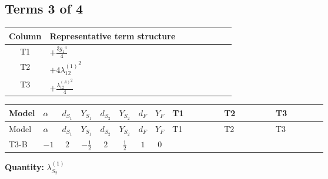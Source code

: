 \documentclass[8pt]{article}
\begin{document}
\begin{landscape}
\subsection*{Terms 3 of 4}
\begin{center}
\begin{tabular}{@{}c >{\raggedright\arraybackslash}p{0.82\linewidth}@{}}
\toprule
Column & Representative term structure \\
\midrule
T1 & \(\displaystyle +\frac{3 {g_1}^4}{4}\) \\
\midrule
T2 & \(\displaystyle +4 {\lambda_{12}^{(1)}}^2\) \\
\midrule
T3 & \(\displaystyle +\frac{{\lambda_{12}^{(A)}}^2}{4}\) \\
\midrule
\bottomrule
\end{tabular}
\end{center}
\smallskip
\tiny
\begin{longtable}{@{}llcccccc >{\raggedright\arraybackslash}p{0.21\linewidth} >{\raggedright\arraybackslash}p{0.21\linewidth} >{\raggedright\arraybackslash}p{0.21\linewidth}@{}}
\toprule
Model & $\alpha$ & $d_{S_1}$ & $Y_{S_1}$ & $d_{S_2}$ & $Y_{S_2}$ & $d_F$ & $Y_F$ & T1 & T2 & T3 \\
\midrule
\endfirsthead
\toprule
Model & $\alpha$ & $d_{S_1}$ & $Y_{S_1}$ & $d_{S_2}$ & $Y_{S_2}$ & $d_F$ & $Y_F$ & T1 & T2 & T3 \\
\midrule
\endhead
T3-B & $-1$ & $2$ & $-\frac{1}{2}$ & $2$ & $\frac{1}{2}$ & $1$ & $0$ & \scriptsize\adjustbox{max width=\linewidth}{$\begin{gathered} +\frac{3 {g_1}^4}{4}\end{gathered}$} & \scriptsize\adjustbox{max width=\linewidth}{$\begin{gathered} +4 {\lambda_{12}^{(1)}}^2\end{gathered}$} & \scriptsize\adjustbox{max width=\linewidth}{$\begin{gathered} +\frac{{\lambda_{12}^{(A)}}^2}{4}\end{gathered}$} \\
\midrule
\bottomrule
\end{longtable}
\clearpage
\noindent\textbf{Quantity: }$\lambda_{S_2}^{(1)}$\par\smallskip

\end{landscape}
\end{document}
